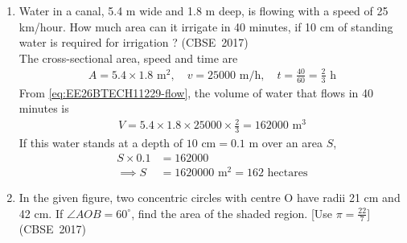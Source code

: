 \begin{enumerate}[label=\thesubsection.\arabic*, ref=\thesubsection.\theenumi]
\begin{align}
	\myvec{\frac{24}{11} \\ y} = \frac{k\myvec{3 \\ 7} + \myvec{2 \\ -2}}{k+1}
\end{align}
Considering the first row,
\begin{align}
	\frac{24}{11} &= \frac{3k+2}{k+1}
	\\
	\implies 24k + 24 &= 33k + 22
	\\
	\implies k &= \frac{2}{9}
\end{align}
Thus, the ratio is $2:9$. Considering the second row,
\begin{align}
	y = \frac{7k - 2}{k+1} = \frac{\frac{14}{9} - 2}{\frac{11}{9}} = -\frac{4}{11}
\end{align}
The following code verifies the solution
\begin{lstlisting}[frame=single, basicstyle=\rmfamily, escapeinside={(*@}{@*)}]
(*@\makebox[\dimexpr\linewidth-2\fboxsep-2\fboxrule\relax][c]{codes/section.c}@*)
\end{lstlisting}
\item 
Water in a canal, 5.4 m wide and 1.8 m deep, is flowing with a speed of 25 km/hour. How much area can it irrigate in 40 minutes, if 10 cm of standing water is required for irrigation ?
\hfill (CBSE~2017)
\\
\solution
The cross-sectional area, speed and time are
\begin{align}
	A = 5.4 \times 1.8 \text{ m}^2, \quad v = 25000 \text{ m/h}, \quad t = \frac{40}{60} = \frac{2}{3} \text{ h}
\end{align}
From \eqref{eq:EE26BTECH11229-flow}, the volume of water that flows in 40 minutes is
\begin{align}
	V = 5.4 \times 1.8 \times 25000 \times \frac{2}{3} = 162000 \text{ m}^3
\end{align}
If this water stands at a depth of $10 \text{ cm} = 0.1 \text{ m}$ over an area $S$,
\begin{align}
	S \times 0.1 &= 162000
	\\
	\implies S &= 1620000 \text{ m}^2 = 162 \text{ hectares}
\end{align}
\item 
In the given figure, two concentric circles with centre O have radii 21 cm and 42 cm. If $\angle AOB = 60^{\circ}$, find the area of the shaded region.
\hfill [Use $\pi = \frac{22}{7}$] \hfill (CBSE~2017)
\begin{figure}[H]
	\centering
\begin{tikzpicture}[scale=1.6]

\end{tikzpicture}
\end{figure}
\end{enumerate}
